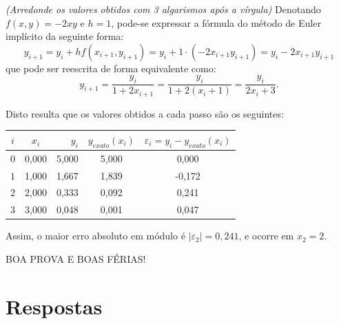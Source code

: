\documentclass[12pt,a4paper]{article}
\begin{document}
\begin{ExerciseList}
{\color{blue} \textit{(Arredonde os valores obtidos com 3 algarismos após a vírgula)}}
\Answer Denotando $f(x,y) = -2 x y$ e $h = 1$, pode-se expressar a fórmula do método de Euler implícito da seguinte forma:
\[
y_{i + 1} = y_{i} + h f(x_{i + 1}, y_{i + 1})
= y_{i} + 1 \cdot ( -2 x_{i + 1} y_{i + 1} )
= y_{i} -2 x_{i + 1} y_{i + 1}
\]
que pode ser reescrita de forma equivalente como:
\[
y_{i + 1} = \frac{y_{i}}{1 + 2 x_{i + 1}} = \frac{y_{i}}{1 + 2 (x_i + 1)} = \frac{y_{i}}{2x_i + 3}.
\]

Disto resulta que os valores obtidos a cada passo são os seguintes:
\medskip
\begin{center}
\begin{tabular}{ccrcc}
\hline
$i$ & $x_i$ & $y_i$ & $y_{exato}(x_i)$ & $\varepsilon_i = y_i-y_{exato}(x_i)$ \\ \hline
$0$ & 0,000 & 5,000 & 5,000 & \phantom{-}0,000 \\
$1$ & 1,000 & 1,667 & 1,839 & -0,172 \\
$2$ & 2,000 & 0,333 & 0,092 & \phantom{-}0,241 \\
$3$ & 3,000 & 0,048 & 0,001 & \phantom{-}0,047 \\ \hline
\end{tabular}
\end{center}
\medskip
Assim, o maior erro absoluto em módulo é $|\varepsilon_2| = 0,241$, e ocorre em $\boxed{x_2 = 2}$.

\end{ExerciseList}

\vfill
\begin{center}
BOA PROVA E BOAS FÉRIAS!
\end{center}

\newpage
\restoregeometry
\section*{Respostas}
\shipoutAnswer
\end{document}

